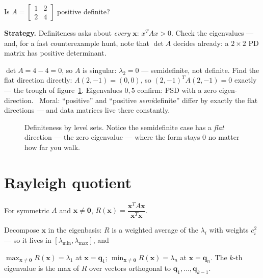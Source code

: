 \begin{example}\label{ex:psdtrap}
Is $A=\begin{bmatrix}1&2\\2&4\end{bmatrix}$ positive definite?
\par\smallskip
\textbf{Strategy.} Definiteness asks about \emph{every} $\mathbf{x}$:
$x^{T}Ax>0$. Check the eigenvalues --- and, for a fast counterexample
hunt, note that $\det A$ decides already: a $2\times2$ PD matrix has
positive determinant.
\begin{solution}
$\det A=4-4=0$, so $A$ is singular: $\lambda_2=0$ --- semidefinite,
not definite. Find the flat direction directly:
$A(2,-1)=(0,0)$, so $(2,-1)^{T}A(2,-1)=0$ exactly --- the trough of
figure~\ref{fig:defgallery}. Eigenvalues $0,5$ confirm: PSD with a
zero eigen-direction. \checkmark\ Moral: ``positive'' and ``positive
\emph{semi}definite'' differ by exactly the flat directions --- and
data matrices live there constantly.
\end{solution}
\end{example}

\begin{figure}[htbp]\centering

\caption{Definiteness by level sets. Notice the semidefinite case has
a \emph{flat} direction --- the zero eigenvalue --- where the form
stays $0$ no matter how far you walk.}
\label{fig:defgallery}
\end{figure}

\section{Rayleigh quotient}\label{sec:rayleigh}

\begin{definition}
For symmetric $A$ and $\mathbf x\ne\mathbf0$,
$R(\mathbf x)=\dfrac{\mathbf x^{T}A\mathbf x}{\mathbf x^{T}\mathbf x}$.
\end{definition}

Decompose $\mathbf x$ in the eigenbasis: $R$ is a weighted average of the
$\lambda_i$ with weights $c_i^{2}$ --- so it lives in
$[\lambda_{\min},\lambda_{\max}]$, and

\begin{theorem}
$\max_{\mathbf x\ne\mathbf0}R(\mathbf x)=\lambda_1$ at $\mathbf x=\mathbf q_1$;
$\min_{\mathbf x\ne\mathbf0}R(\mathbf x)=\lambda_n$ at $\mathbf x=\mathbf q_n$.
The $k$-th eigenvalue is the max of $R$ over vectors orthogonal to
$\mathbf q_1,\dots,\mathbf q_{k-1}$.
\end{theorem}

